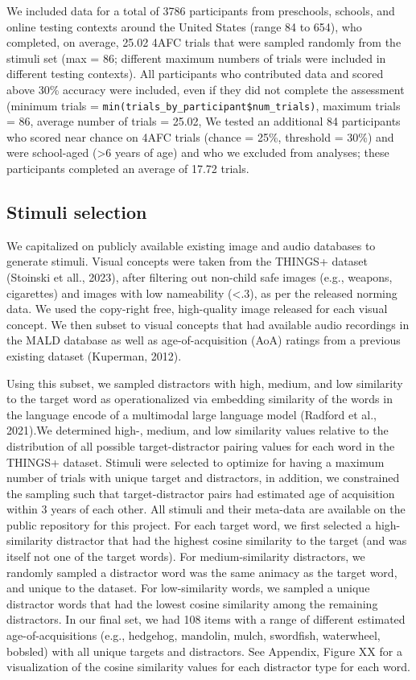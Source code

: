 \documentclass[
  man,floatsintext]{apa6}
\begin{document}
We included data for a total of 3786 participants from preschools, schools, and online testing contexts around the United States (range 84 to 654), who completed, on average, 25.02 4AFC trials that were sampled randomly from the stimuli set (max = 86; different maximum numbers of trials were included in different testing contexts). All participants who contributed data and scored above 30\% accuracy were included, even if they did not complete the assessment (minimum trials = \texttt{min(trials\_by\_participant\$num\_trials)}, maximum trials = 86, average number of trials = 25.02, We tested an additional 84 participants who scored near chance on 4AFC trials (chance = 25\%, threshold = 30\%) and were school-aged (\textgreater6 years of age) and who we excluded from analyses; these participants completed an average of 17.72 trials.

\subsection{Stimuli selection}\label{stimuli-selection}

We capitalized on publicly available existing image and audio databases to generate stimuli. Visual concepts were taken from the THINGS+ dataset (Stoinski et all., 2023), after filtering out non-child safe images (e.g., weapons, cigarettes) and images with low nameability (\textless.3), as per the released norming data. We used the copy-right free, high-quality image released for each visual concept. We then subset to visual concepts that had available audio recordings in the MALD database as well as age-of-acquisition (AoA) ratings from a previous existing dataset (Kuperman, 2012).

Using this subset, we sampled distractors with high, medium, and low similarity to the target word as operationalized via embedding similarity of the words in the language encode of a multimodal large language model (Radford et al., 2021).We determined high-, medium, and low similarity values relative to the distribution of all possible target-distractor pairing values for each word in the THINGS+ dataset. Stimuli were selected to optimize for having a maximum number of trials with unique target and distractors, in addition, we constrained the sampling such that target-distractor pairs had estimated age of acquisition within 3 years of each other. All stimuli and their meta-data are available on the public repository for this project. For each target word, we first selected a high-similarity distractor that had the highest cosine similarity to the target (and was itself not one of the target words). For medium-similarity distractors, we randomly sampled a distractor word was the same animacy as the target word, and unique to the dataset. For low-similarity words, we sampled a unique distractor words that had the lowest cosine similarity among the remaining distractors. In our final set, we had 108 items with a range of different estimated age-of-acquisitions (e.g., hedgehog, mandolin, mulch, swordfish, waterwheel, bobsled) with all unique targets and distractors. See Appendix, Figure XX for a visualization of the cosine similarity values for each distractor type for each word.
\end{document}
